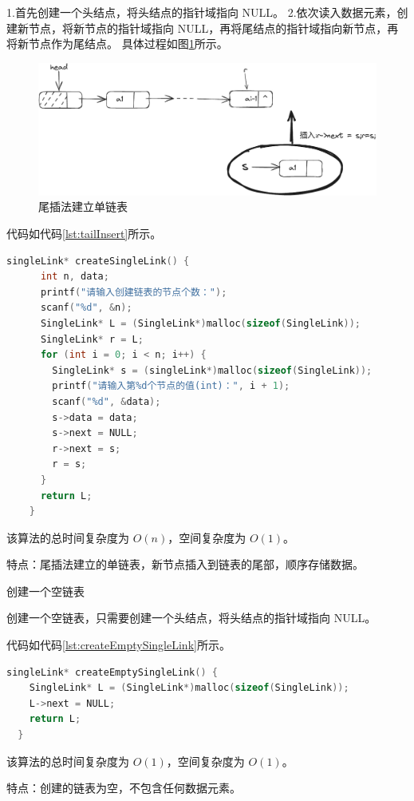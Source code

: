 \documentclass[lang=cn,newtx,10pt,scheme=chinese]{elegantbook}
\begin{document}
  1.首先创建一个头结点，将头结点的指针域指向 NULL。
  2.依次读入数据元素，创建新节点，将新节点的指针域指向 NULL，再将尾结点的指针域指向新节点，再将新节点作为尾结点。
  具体过程如图\ref{fig:tailInsert}所示。
  \begin{figure}[h]
    \centering
    \includegraphics[width=1\textwidth]{./figure/pdf/cropped/tailInsert.pdf}
    \caption{尾插法建立单链表}
    \label{fig:tailInsert}
  \end{figure}
  代码如代码\ref{lst:tailInsert}所示。
  \begin{lstlisting}[language=C++, caption={尾插法建立单链表示例代码}, label={lst:tailInsert}]
    singleLink* createSingleLink() {
      int n, data;
      printf("请输入创建链表的节点个数：");
      scanf("%d", &n);
      SingleLink* L = (SingleLink*)malloc(sizeof(SingleLink));
      SingleLink* r = L;
      for (int i = 0; i < n; i++) {
        SingleLink* s = (singleLink*)malloc(sizeof(SingleLink));
        printf("请输入第%d个节点的值(int)：", i + 1);
        scanf("%d", &data);
        s->data = data;
        s->next = NULL;
        r->next = s;
        r = s;
      }
      return L;
    }
    \end{lstlisting}
    该算法的总时间复杂度为 $O(n)$，空间复杂度为 $O(1)$。

    特点：尾插法建立的单链表，新节点插入到链表的尾部，顺序存储数据。

创建一个空链表

创建一个空链表，只需要创建一个头结点，将头结点的指针域指向 NULL。

代码如代码\ref{lst:createEmptySingleLink}所示。
\begin{lstlisting}[language=C++, caption={创建一个空链表示例代码}, label={lst:createEmptySingleLink}]
  singleLink* createEmptySingleLink() {
    SingleLink* L = (SingleLink*)malloc(sizeof(SingleLink));
    L->next = NULL;
    return L;
  }
\end{lstlisting}
该算法的总时间复杂度为 $O(1)$，空间复杂度为 $O(1)$。

特点：创建的链表为空，不包含任何数据元素。
\end{document}
